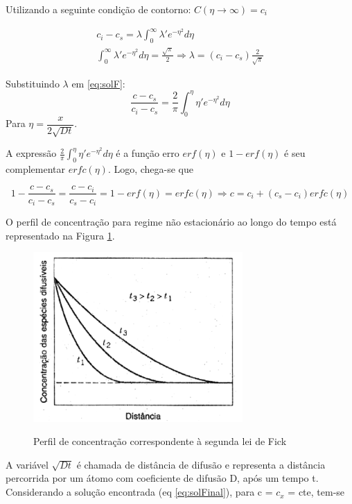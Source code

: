 \documentclass[]{politex}
\begin{document}
Utilizando a seguinte condição de contorno: $C(\eta\rightarrow \infty) = c_i$ 

\begin{gather*}	
	c_i - c_s = \lambda\int_{0}^{\infty} \lambda'e^{-\eta^2} d\eta  \\
	\int_{0}^{\infty} \lambda'e^{-\eta^2} d\eta  = \frac{\sqrt{\pi}}{2} \Rightarrow 			\lambda = (c_i - c_s)\frac{2}{\sqrt{\pi}}
\end{gather*}

Substituindo $\lambda$ em \autoref{eq:solF}:
\begin{equation} \label{eq:solG}
	\frac{c - c_s}{c_i - c_s} = \frac{2}{\pi} \int_{0}^{\eta} \eta'e^{-\eta^2} d\eta   
\end{equation}
Para $\eta = \dfrac{x}{2\sqrt{Dt}}$.

A expressão $ \frac{2}{\pi} \int_{0}^{\eta} \eta'e^{-\eta^2} d\eta $ é a função erro $erf(\eta)$ e  $1 - erf(\eta)$ é seu complementar $erfc(\eta)$. Logo, chega-se que 

\begin{equation} \label{eq:solFinal}
	1 - \frac{c - c_s}{c_i - c_s} = \frac{c - c_i}{c_s - c_i} = 1 - erf(\eta) = erfc(\eta) \Rightarrow c = c_i + (c_s - c_i) erfc(\eta)
\end{equation}

\par O perfil de concentração para regime não estacionário ao longo do tempo está representado na Figura \ref{fig:segundaLei}.

\begin{figure}[ht]
	\caption{Perfil de concentração correspondente à segunda lei de Fick}
	\includegraphics[width=80mm,scale=0.5]{segundaLei}
	\label{fig:segundaLei}
	\centering
\end{figure}

\par
	A variável $\sqrt{Dt}$ é chamada de distância de difusão e representa a distância percorrida por um átomo com coeficiente de difusão D, após um tempo t. Considerando a solução encontrada (eq \autoref{eq:solFinal}), para c =  $c_x$ = cte, tem-se
\end{document}
